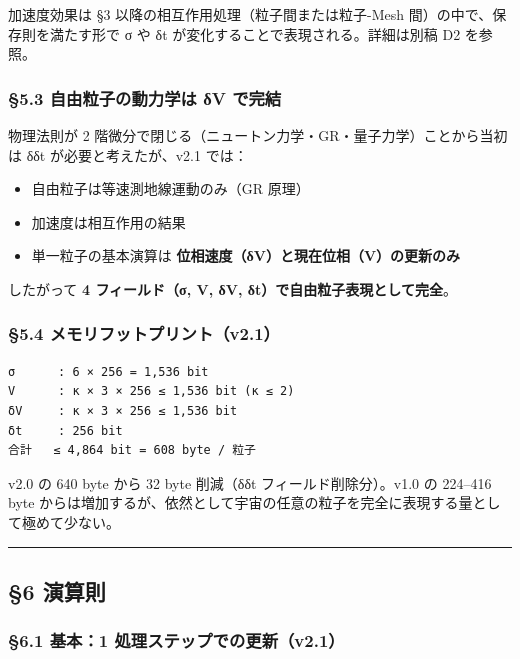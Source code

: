 \documentclass[a4paper,11pt]{ltjsarticle}
\providecommand{\tightlist}{\setlength{\itemsep}{0pt}\setlength{\parskip}{0pt}}
\begin{document}
加速度効果は §3 以降の相互作用処理（粒子間または粒子-Mesh
間）の中で、保存則を満たす形で σ や δt
が変化することで表現される。詳細は別稿 D2 を参照。

\subsubsection{§5.3 自由粒子の動力学は δV
で完結}\label{ux81eaux7531ux7c92ux5b50ux306eux52d5ux529bux5b66ux306f-ux3b4v-ux3067ux5b8cux7d50}

物理法則が 2
階微分で閉じる（ニュートン力学・GR・量子力学）ことから当初は δδt
が必要と考えたが、v2.1 では：

\begin{itemize}
\tightlist
\item
  自由粒子は等速測地線運動のみ（GR 原理）
\item
  加速度は相互作用の結果
\item
  単一粒子の基本演算は \textbf{位相速度（δV）と現在位相（V）の更新のみ}
\end{itemize}

したがって \textbf{4 フィールド（σ, V, δV,
δt）で自由粒子表現として完全}。

\subsubsection{§5.4
メモリフットプリント（v2.1）}\label{ux30e1ux30e2ux30eaux30d5ux30c3ux30c8ux30d7ux30eaux30f3ux30c8v2.1}

\begin{verbatim}
σ      : 6 × 256 = 1,536 bit
V      : κ × 3 × 256 ≤ 1,536 bit (κ ≤ 2)
δV     : κ × 3 × 256 ≤ 1,536 bit
δt     : 256 bit
合計   ≤ 4,864 bit = 608 byte / 粒子
\end{verbatim}

v2.0 の 640 byte から 32 byte 削減（δδt フィールド削除分）。v1.0 の
224--416 byte
からは増加するが、依然として宇宙の任意の粒子を完全に表現する量として極めて少ない。

\begin{center}\rule{0.5\linewidth}{0.5pt}\end{center}

\subsection{§6 演算則}\label{ux6f14ux7b97ux5247}

\subsubsection{§6.1 基本：1
処理ステップでの更新（v2.1）}\label{ux57faux672c1-ux51e6ux7406ux30b9ux30c6ux30c3ux30d7ux3067ux306eux66f4ux65b0v2.1}
\end{document}
